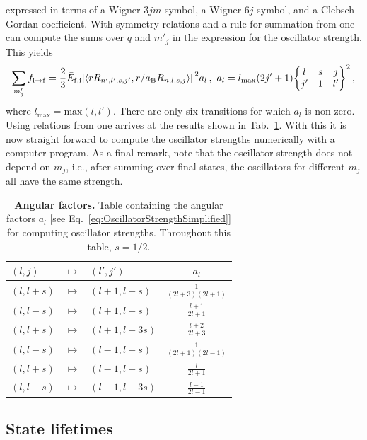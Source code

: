 \documentclass[fontsize=12pt,
               twoside=false,
               BCOR=0mm,
               DIV=14,
               overfullrule=false, %
               toc=bibliography,
               headinclude=true,
               footinclude=false]{scrartcl}
\numberwithin{equation}{section}
\newcommand{\aB}{a_\mathrm{B}}
\def\TabAngularFactors{
    \begin{table}[t]
        \centering
        \begin{tabular}{lllc}
            \toprule
            $(l,j)$ & $\mapsto$ & $(l',j')$ & $a_l$ \\
            \midrule
            $(l,l+s)$ & $\mapsto$ & $(l+1,l+s)$  & $\frac{1}{(2l+3)(2l+1)}$ \\
            $(l,l-s)$ & $\mapsto$ & $(l+1,l+s)$  & $\frac{l+1}{2l+1}$       \\
            $(l,l+s)$ & $\mapsto$ & $(l+1,l+3s)$ & $\frac{l+2}{2l+3}$       \\
            $(l,l-s)$ & $\mapsto$ & $(l-1,l-s)$  & $\frac{1}{(2l+1)(2l-1)}$ \\
            $(l,l+s)$ & $\mapsto$ & $(l-1,l-s)$  & $\frac{l}{2l+1}$         \\
            $(l,l-s)$ & $\mapsto$ & $(l-1,l-3s)$ & $\frac{l-1}{2l-1}$       \\
            \bottomrule
        \end{tabular}
        \caption{\textbf{Angular factors.} Table containing the angular factors
                 $a_l$ [see Eq.~\eqref{eq:OscillatorStrengthSimplified}] for
                 computing oscillator strengths. Throughout this table,
                 $s=1\slash{2}$.}
        \label{tab:AngularFactors}
    \end{table}
}
\begin{document}
    expressed in terms of a Wigner $3jm$-symbol, a Wigner $6j$-symbol, and a
    Clebsch-Gordan coefficient. With symmetry relations and a rule for summation
    from \cite[p.~236,259]{varshalovic1988} one can compute the sums over $q$
    and $m'_j$ in the expression for the oscillator strength. This yields
    \begin{equation}\label{eq:OscillatorStrengthSimplified}
        \sum_{m'_j} f_{\mathrm{i}\to\mathrm{f}}
        =
        \frac{2}{3} \bar{E}_\mathrm{f,i}
        \abs*{\langle r R_{n',l',s,j'}, r\slash\aB R_{n,l,s,j} \rangle}^2
        a_l
    \,, \
        a_l
        =
        l_\mathrm{max} (2j'+1)
        \bigg\{\mqty{l & s & j \\ j' & 1 & l'}\bigg\}^2
    \,,
    \end{equation}
    where $l_\mathrm{max}=\mathrm{max}(l,l')$. There are only six transitions
    for which $a_l$ is non-zero. Using relations from
    \cite[p.~298,300]{varshalovic1988} one arrives at the results shown in
    Tab.~\ref{tab:AngularFactors}. With this it is now straight forward to
    compute the oscillator strengths numerically with a computer program. As a
    final remark, note that the oscillator strength does not depend on $m_j$,
    i.e., after summing over final states, the oscillators for different $m_j$
    all have the same strength.

    \TabAngularFactors

    \subsection{State lifetimes}
    \label{subsec:StateLifetimes}
\end{document}
